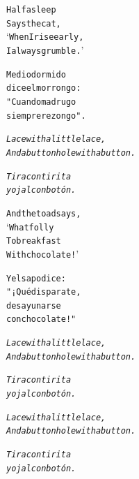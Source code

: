 \documentclass[11pt]{article}
\begin{document}
\begin{parcolumns}{2}
\colchunk
{
\begin{alltt}\normalfont
Half asleep
Says the cat,
‘When I rise early,
I always grumble.’
\end{alltt}
}

\colchunk
{
\begin{alltt}\normalfont
Medio dormido
dice el morrongo:
"Cuando madrugo
siempre rezongo".
\end{alltt}
}

\colplacechunks

\colchunk
{
\begin{alltt}\normalfont
\emph{Lace with a little lace,
And a buttonhole with a button.}
\end{alltt}
}

\colchunk
{
\begin{alltt}\normalfont
\emph{Tira con tirita
y ojal con botón.}
\end{alltt}
}

\colplacechunks

\colchunk
{
\begin{alltt}\normalfont
And the toad says,
‘What folly
To breakfast
With chocolate!’
\end{alltt}
}

\colchunk
{
\begin{alltt}\normalfont
Y el sapo dice:
"¡Qué disparate,
desayunarse
con chocolate!"
\end{alltt}
}

\colplacechunks

\colchunk
{
\begin{alltt}\normalfont
\emph{Lace with a little lace,
And a buttonhole with a button.}
\end{alltt}
}

\colchunk
{
\begin{alltt}\normalfont
\emph{Tira con tirita
y ojal con botón.}
\end{alltt}
}

\colplacechunks

\colchunk
{
\begin{alltt}\normalfont
\emph{Lace with a little lace,
And a buttonhole with a button.}
\end{alltt}
}

\colchunk
{
\begin{alltt}\normalfont
\emph{Tira con tirita
y ojal con botón.}
\end{alltt}
}

\colplacechunks

\end{parcolumns}
\end{document}
